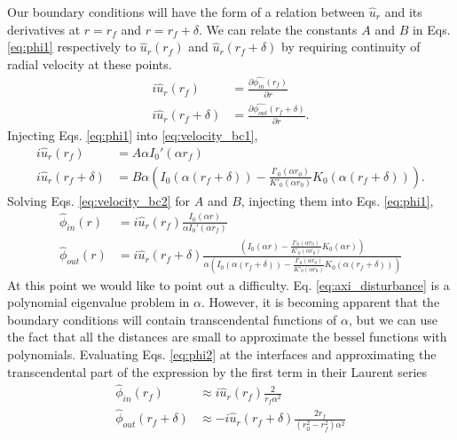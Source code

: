 \documentclass[superscriptaddress, onecolumn, prl]{revtex4}
\begin{document}
Our boundary conditions will have the form of a relation between $\hat{u}_r$ and its derivatives at $r=r_f$ and $r=r_f+\delta$. We can relate the constants $A$ and $B$ in Eqs. \ref{eq:phi1} respectively to $\hat{u}_r(r_f)$ and $\hat{u}_r(r_f+\delta)$ by requiring continuity of radial velocity at these points.
\begin{equation}
\label{eq:velocity_bc1}
\begin{split}
i\hat{u}_r(r_f) &= \frac{\partial \hat{\phi_{in}}(r_f)}{\partial r} \\
i\hat{u}_r(r_f+\delta) &= \frac{\partial \hat{\phi_{out}}(r_f+\delta)}{\partial r}.
\end{split}
\end{equation}
Injecting Eqs. \ref{eq:phi1} into \ref{eq:velocity_bc1},
\begin{equation}
\label{eq:velocity_bc2}
\begin{split}
i\hat{u}_r(r_f) &= A \alpha I_0'(\alpha r_f) \\
i\hat{u}_r(r_f+\delta) &= B \alpha \left(I_0(\alpha (r_f+\delta)) - \frac{I'_0(\alpha r_0)}{K'_0(\alpha r_0)}K_0(\alpha (r_f+\delta))  \right).
\end{split}
\end{equation}
Solving Eqs. \ref{eq:velocity_bc2} for $A$ and $B$, injecting them into Eqs. \ref{eq:phi1},
\begin{equation}
\label{eq:phi2}
\begin{split}
\hat{\phi}_{in}(r) &= i\hat{u}_r(r_f) \frac{I_0(\alpha r)}{\alpha I_0'(\alpha r_f)} \\
\hat{\phi}_{out}(r) &= i\hat{u}_r(r_f+\delta) \frac{\left(I_0(\alpha r) - \frac{I'_0(\alpha r_0)}{K'_0(\alpha r_0)}K_0(\alpha r)  \right)}{\alpha \left(I_0(\alpha (r_f+\delta)) - \frac{I'_0(\alpha r_0)}{K'_0(\alpha r_0)}K_0(\alpha (r_f+\delta))  \right)} 
\end{split}
\end{equation}
At this point we would like to point out a difficulty. Eq. \ref{eq:axi_disturbance} is a polynomial eigenvalue problem in $\alpha$. However, it is becoming apparent that the boundary conditions will contain transcendental functions of $\alpha$, but we can use the fact that all the distances are small to approximate the bessel functions with polynomials. Evaluating Eqs. \ref{eq:phi2} at the interfaces and approximating the transcendental part of the expression by the first term in their Laurent series
\begin{equation}
\label{eq:phi3}
\begin{split}
\hat{\phi}_{in}(r_f) &\approx i\hat{u}_r(r_f) \frac{2}{r_f \alpha^2} \\
\hat{\phi}_{out}(r_f+\delta) &\approx -i\hat{u}_r(r_f+\delta) \frac{2 r_f}{(r_0^2 - r_f^2) \alpha^2} 
\end{split}
\end{equation}
\end{document}
